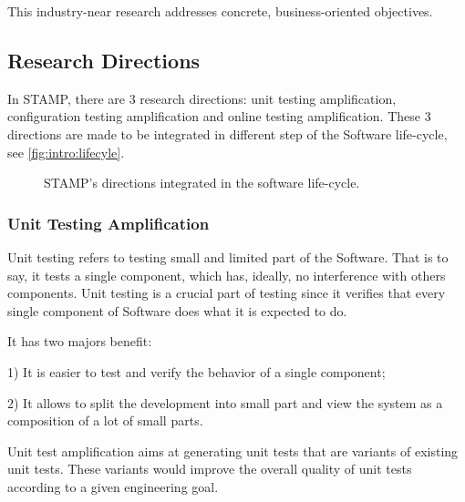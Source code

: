 This industry-near research addresses concrete, business-oriented objectives.

\subsection{Research Directions}
\label{subsec:intro:research-directions}

In STAMP, there are 3 research directions: unit testing amplification, configuration testing amplification and online testing amplification.
These 3 directions are made to be integrated in different step of the Software life-cycle, see \autoref{fig:intro:lifecyle}.

\begin{figure}[h]
	\centering
	\caption{STAMP's directions integrated in the software life-cycle.}
	\label{fig:intro:lifecyle}
\end{figure}

\subsubsection{Unit Testing Amplification}
\label{subsubsec:intro:research-directions:unit-test-ampl}

Unit testing refers to testing small and limited part of the Software.
That is to say, it tests a single component, which has, ideally, no interference with others components.
Unit testing is a crucial part of testing since it verifies that every single component of Software does what it is expected to do.

It has two majors benefit:

1) It is easier to test and verify the behavior of a single component;

2) It allows to split the development into small part and view the system as a composition of a lot of small parts.

Unit test amplification aims at generating unit tests that are variants of existing unit tests.
These variants would improve the overall quality of unit tests according to a given engineering goal.

